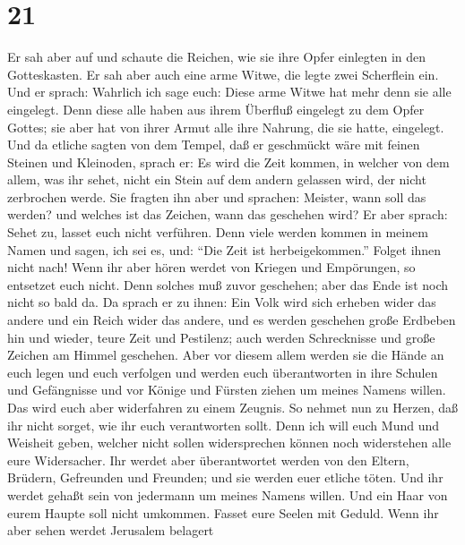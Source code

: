 \hypertarget{section-20}{%
\section{21}\label{section-20}}

 Er sah aber auf und schaute die Reichen, wie sie ihre Opfer
einlegten in den Gotteskasten.  Er sah aber auch eine arme
Witwe, die legte zwei Scherflein ein.  Und er sprach:
Wahrlich ich sage euch: Diese arme Witwe hat mehr denn sie alle
eingelegt.  Denn diese alle haben aus ihrem Überfluß
eingelegt zu dem Opfer Gottes; sie aber hat von ihrer Armut alle ihre
Nahrung, die sie hatte, eingelegt.  Und da etliche sagten
von dem Tempel, daß er geschmückt wäre mit feinen Steinen und Kleinoden,
sprach er:  Es wird die Zeit kommen, in welcher von dem
allem, was ihr sehet, nicht ein Stein auf dem andern gelassen wird, der
nicht zerbrochen werde.  Sie fragten ihn aber und sprachen:
Meister, wann soll das werden? und welches ist das Zeichen, wann das
geschehen wird?  Er aber sprach: Sehet zu, lasset euch nicht
verführen. Denn viele werden kommen in meinem Namen und sagen, ich sei
es, und: ``Die Zeit ist herbeigekommen.'' Folget ihnen nicht nach!
 Wenn ihr aber hören werdet von Kriegen und Empörungen, so
entsetzet euch nicht. Denn solches muß zuvor geschehen; aber das Ende
ist noch nicht so bald da.  Da sprach er zu ihnen: Ein Volk
wird sich erheben wider das andere und ein Reich wider das andere,
 und es werden geschehen große Erdbeben hin und wieder,
teure Zeit und Pestilenz; auch werden Schrecknisse und große Zeichen am
Himmel geschehen.  Aber vor diesem allem werden sie die
Hände an euch legen und euch verfolgen und werden euch überantworten in
ihre Schulen und Gefängnisse und vor Könige und Fürsten ziehen um meines
Namens willen.  Das wird euch aber widerfahren zu einem
Zeugnis.  So nehmet nun zu Herzen, daß ihr nicht sorget,
wie ihr euch verantworten sollt.  Denn ich will euch Mund
und Weisheit geben, welcher nicht sollen widersprechen können noch
widerstehen alle eure Widersacher.  Ihr werdet aber
überantwortet werden von den Eltern, Brüdern, Gefreunden und Freunden;
und sie werden euer etliche töten.  Und ihr werdet gehaßt
sein von jedermann um meines Namens willen.  Und ein Haar
von eurem Haupte soll nicht umkommen.  Fasset eure Seelen
mit Geduld.  Wenn ihr aber sehen werdet Jerusalem belagert
